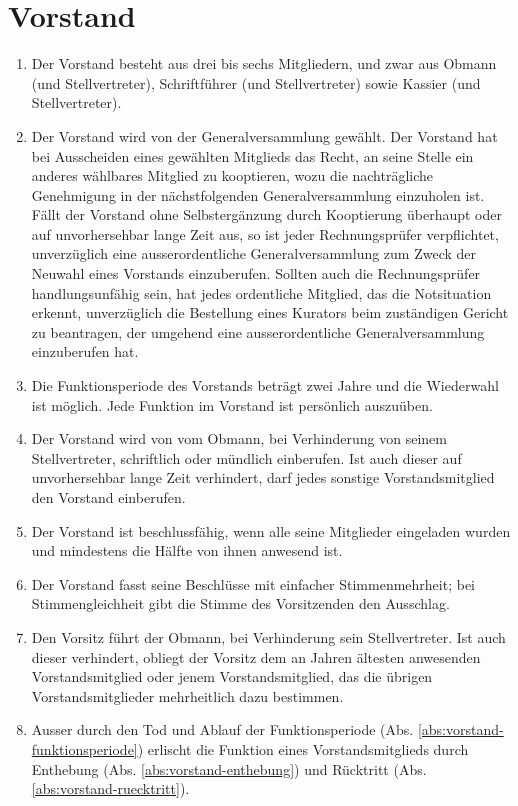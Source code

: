 \documentclass[a4paper,12pt]{article}
\newcommand{\funktionsperiode}{zwei Jahre }
\begin{document}
	\section{Vorstand}
		\label{sec:vorstand}
		\begin{enumerate}
			\item Der Vorstand besteht aus drei bis sechs Mitgliedern, und zwar aus Obmann (und Stellvertreter), Schriftführer (und Stellvertreter) sowie Kassier (und Stellvertreter).
			\item Der Vorstand wird von der Generalversammlung gewählt. Der Vorstand hat bei Ausscheiden eines gewählten Mitglieds das Recht, an seine Stelle ein anderes wählbares Mitglied zu kooptieren, wozu die nachträgliche Genehmigung in der nächstfolgenden Generalversammlung einzuholen ist. Fällt der Vorstand ohne Selbstergänzung durch Kooptierung überhaupt oder auf unvorhersehbar lange Zeit aus, so ist jeder Rechnungsprüfer verpflichtet, unverzüglich eine ausserordentliche Generalversammlung zum Zweck der Neuwahl eines Vorstands einzuberufen. Sollten auch die Rechnungsprüfer handlungsunfähig sein, hat jedes ordentliche Mitglied, das die Notsituation erkennt, unverzüglich die Bestellung eines Kurators beim zuständigen Gericht zu beantragen, der umgehend eine ausserordentliche Generalversammlung einzuberufen hat.
			\label{abs:vorstand-wahl}
			\item Die Funktionsperiode des Vorstands beträgt \funktionsperiode und die Wiederwahl ist möglich. Jede Funktion im Vorstand ist persönlich auszuüben.
			\label{abs:vorstand-funktionsperiode}
			\item Der Vorstand wird von vom Obmann, bei Verhinderung von seinem Stellvertreter, schriftlich oder mündlich einberufen. Ist auch dieser auf unvorhersehbar lange Zeit verhindert, darf jedes sonstige Vorstandsmitglied den Vorstand einberufen.
			\item  Der Vorstand ist beschlussfähig, wenn alle seine Mitglieder eingeladen wurden und mindestens die Hälfte von ihnen anwesend ist.
			\item Der Vorstand fasst seine Beschlüsse mit einfacher Stimmenmehrheit; bei Stimmengleichheit gibt die Stimme des Vorsitzenden den Ausschlag.
			\item Den Vorsitz führt der Obmann, bei Verhinderung sein Stellvertreter. Ist auch dieser verhindert, obliegt der Vorsitz dem an Jahren ältesten anwesenden Vorstandsmitglied oder jenem Vorstandsmitglied, das die übrigen Vorstandsmitglieder mehrheitlich dazu bestimmen.
			\item Ausser durch den Tod und Ablauf der Funktionsperiode (Abs. \ref{abs:vorstand-funktionsperiode}) erlischt die Funktion eines Vorstandsmitglieds durch Enthebung (Abs. \ref{abs:vorstand-enthebung}) und Rücktritt (Abs. \ref{abs:vorstand-ruecktritt}).

\end{enumerate}
\end{document}
